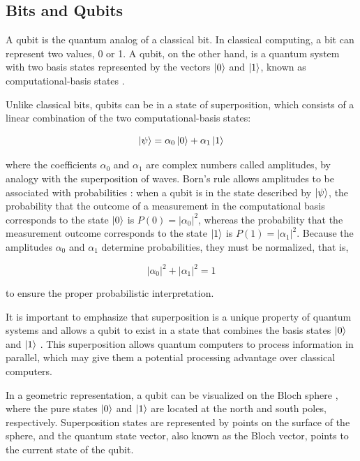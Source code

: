 \subsection{Bits and Qubits} \label{Qubits}

A qubit is the quantum analog of a classical bit. In classical computing, a bit can represent two values, 0 or 1. A qubit, on the other hand, is a quantum system with two basis states represented by the vectors $\ket{0}$ and $\ket{1}$, known as computational-basis states \cite{Nielsen,Mermin2007QComputerScience}.

Unlike classical bits, qubits can be in a state of superposition, which consists of a linear combination of the two computational-basis states:
%
%
\begin{center}
\begin{equation}
\ket{\psi} = \alpha_0\ket{0} + \alpha_1\ket{1} 
\end{equation}
\end{center}
%
%
\noindent where the coefficients $\alpha_0$ and $\alpha_1$ are complex numbers called amplitudes, by analogy with the superposition of waves. Born's rule allows amplitudes to be associated with probabilities \cite{Dirac,Nielsen,Mermin2007QComputerScience,Zubairy2020,Wong2022IntroductionClassicalQuantum}: when a qubit is in the state described by $\ket{\psi}$, the probability that the outcome of a measurement in the computational basis corresponds to the state $\ket{0}$ is $P(0)=|\alpha_0|^2$, whereas the probability that the measurement outcome corresponds to the state $\ket{1}$ is $P(1)=|\alpha_1|^2$. Because the amplitudes $\alpha_0$ and $\alpha_1$ determine probabilities, they must be normalized, that is,
%
%
\begin{center}
\begin{equation}
 |\alpha_0|^2 + |\alpha_1|^2 = 1 
\end{equation}
\end{center}
%
%
\noindent to ensure the proper probabilistic interpretation.

It is important to emphasize that superposition is a unique property of quantum systems and allows a qubit to exist in a state that combines the basis states $\ket{0}$ and $\ket{1}$ \cite{Wong2022IntroductionClassicalQuantum}. This superposition allows quantum computers to process information in parallel, which may give them a potential processing advantage over classical computers.

In a geometric representation, a qubit can be visualized on the Bloch sphere \cite{Wong2022IntroductionClassicalQuantum}, where the pure states $\ket{0}$ and $\ket{1}$ are located at the north and south poles, respectively. Superposition states are represented by points on the surface of the sphere, and the quantum state vector, also known as the Bloch vector, points to the current state of the qubit.

